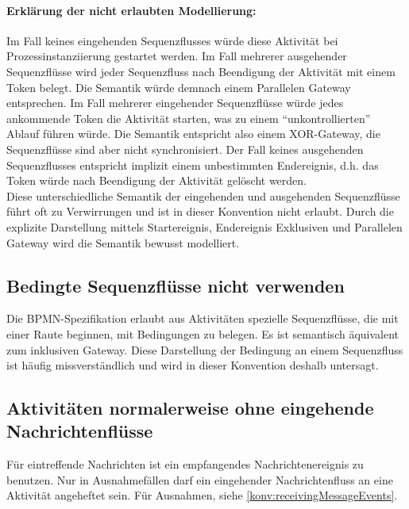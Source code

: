 \documentclass[12pt,report]{snetTeaching}
\begin{document}
\paragraph{Erklärung der nicht erlaubten Modellierung:} Im Fall keines eingehenden Sequenzflusses würde diese Aktivität bei Prozessinstanziierung gestartet werden. 
Im Fall mehrerer ausgehender Sequenzflüsse wird jeder Sequenzfluss nach Beendigung der Aktivität mit einem Token belegt. Die Semantik würde demnach einem Parallelen Gateway entsprechen.
Im Fall mehrerer eingehender Sequenzflüsse würde jedes ankommende Token die Aktivität starten, was zu einem "`unkontrollierten"' Ablauf führen würde. Die Semantik entspricht also einem XOR-Gateway, die Sequenzflüsse sind aber nicht synchronisiert.
Der Fall keines ausgehenden Sequenzflusses entspricht implizit einem unbestimmten Endereignis, d.h. das Token würde nach Beendigung der Aktivität gelöscht werden.\\
Diese unterschiedliche Semantik der eingehenden und ausgehenden Sequenzflüsse führt oft zu Verwirrungen und ist in dieser Konvention nicht erlaubt. Durch die explizite Darstellung mittels Startereignis, Endereignis Exklusiven und Parallelen Gateway wird die Semantik bewusst modelliert.




\newpage
\subsection{Bedingte Sequenzflüsse nicht verwenden}

Die BPMN-Spezifikation erlaubt aus Aktivitäten spezielle Sequenzflüsse, die mit einer Raute beginnen, mit Bedingungen zu belegen. Es ist semantisch äquivalent zum inklusiven Gateway. Diese Darstellung der Bedingung an einem Sequenzfluss ist häufig missverständlich und wird in dieser Konvention deshalb untersagt. 

\begin{Rahmen}
	\hfill
\end{Rahmen}

\subsection{Aktivitäten normalerweise ohne eingehende Nachrichtenflüsse}

Für eintreffende Nachrichten ist ein empfangendes Nachrichtenereignis zu benutzen. Nur in Ausnahmefällen darf ein eingehender Nachrichtenfluss an eine Aktivität angeheftet sein. Für Ausnahmen, siehe \ref{konv:receivingMessageEvents}.
\end{document}
